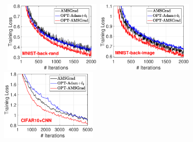 \documentclass[wcp]{jmlr}
\begin{document}
\begin{figure}[t]
\centering
\mbox{\hspace{-0.2in}
\includegraphics[width=1.8in]{simulation/fig2/M_rand_train_loss_no1.eps}\hspace{-0.1in}
\includegraphics[width=1.8in]{simulation/fig2/M_image_train_loss_no1.eps}\hspace{-0.1in}
\includegraphics[width=1.8in]{simulation/fig2/cifar_cnn_train_loss_no1.eps}
}


\end{figure}
\end{document}
